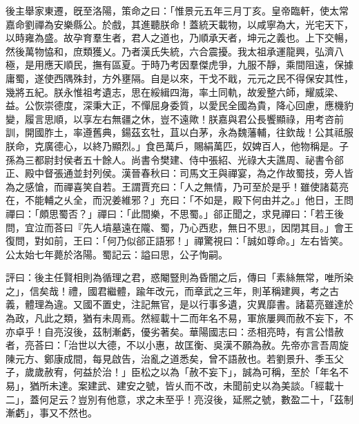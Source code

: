 \begin{pinyinscope}
後主舉家東遷，旣至洛陽，策命之曰：「惟景元五年三月丁亥。皇帝臨軒，使太常嘉命劉禪為安樂縣公。於戲，其進聽朕命！蓋統天載物，以咸寧為大，光宅天下，以時雍為盛。故孕育羣生者，君人之道也，乃順承天者，坤元之義也。上下交暢，然後萬物恊和，庶類獲乂。乃者漢氏失統，六合震擾。我太祖承運龍興，弘濟八極，是用應天順民，撫有區夏。于時乃考因羣傑虎爭，九服不靜，乘間阻遠，保據庸蜀，遂使西隅殊封，方外壅隔。自是以來，干戈不戢，元元之民不得保安其性，幾將五紀。朕永惟祖考遺志，思在綏緝四海，率土同軌，故爰整六師，耀威梁、益。公恢崇德度，深秉大正，不憚屈身委質，以愛民全國為貴，降心回慮，應機豹變，履言思順，以享左右無疆之休，豈不遠歟！朕嘉與君公長饗顯祿，用考咨前訓，開國胙土，率遵舊典，鍚茲玄牡，苴以白茅，永為魏藩輔，往欽哉！公其祗服朕命，克廣德心，以終乃顯烈。」食邑萬戶，賜絹萬匹，奴婢百人，他物稱是。子孫為三都尉封侯者五十餘人。尚書令樊建、侍中張紹、光祿大夫譙周、祕書令郤正、殿中督張通並封列侯。漢晉春秋曰：司馬文王與禪宴，為之作故蜀技，旁人皆為之感愴，而禪喜笑自若。王謂賈充曰：「人之無情，乃可至於是乎！雖使諸葛亮在，不能輔之乆全，而況姜維邪？」充曰：「不如是，殿下何由并之。」他日，王問禪曰：「頗思蜀否？」禪曰：「此間樂，不思蜀。」郤正聞之，求見禪曰：「若王後問，宜泣而荅曰『先人墳墓遠在隴、蜀，乃心西悲，無日不思』，因閉其目。」會王復問，對如前，王曰：「何乃似郤正語邪！」禪驚視曰：「誠如尊命。」左右皆笑。公太始七年薨於洛陽。蜀記云：謚曰思，公子恂嗣。

評曰：後主任賢相則為循理之君，惑閹豎則為昏闇之后，傳曰「素絲無常，唯所染之」，信矣哉！禮，國君繼體，踰年改元，而章武之三年，則革稱建興，考之古義，體理為違。又國不置史，注記無官，是以行事多遺，灾異靡書。諸葛亮雖達於為政，凡此之類，猶有未周焉。然經載十二而年名不易，軍旅屢興而赦不妄下，不亦卓乎！自亮沒後，茲制漸虧，優劣著矣。華陽國志曰：丞相亮時，有言公惜赦者，亮荅曰：「治世以大德，不以小惠，故匡衡、吳漢不願為赦。先帝亦言吾周旋陳元方、鄭康成間，每見啟告，治亂之道悉矣，曾不語赦也。若劉景升、季玉父子，歲歲赦宥，何益於治！」臣松之以為「赦不妄下」，誠為可稱，至於「年名不易」，猶所未達。案建武、建安之號，皆乆而不改，未聞前史以為美談。「經載十二」，蓋何足云？豈別有他意，求之未至乎！亮沒後，延熈之號，數盈二十，「茲制漸虧」，事又不然也。


\end{pinyinscope}